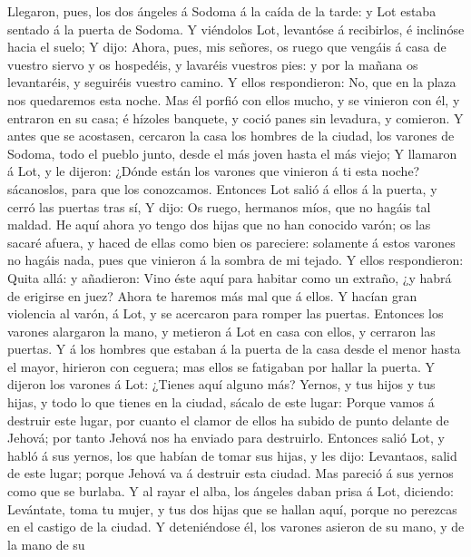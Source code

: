  Llegaron, pues, los dos ángeles á Sodoma á la caída de la
tarde: y Lot estaba sentado á la puerta de Sodoma. Y viéndolos Lot,
levantóse á recibirlos, é inclinóse hacia el suelo;  Y
dijo: Ahora, pues, mis señores, os ruego que vengáis á casa de vuestro
siervo y os hospedéis, y lavaréis vuestros pies: y por la mañana os
levantaréis, y seguiréis vuestro camino. Y ellos respondieron: No, que
en la plaza nos quedaremos esta noche.  Mas él porfió con
ellos mucho, y se vinieron con él, y entraron en su casa; é hízoles
banquete, y coció panes sin levadura, y comieron.  Y antes
que se acostasen, cercaron la casa los hombres de la ciudad, los varones
de Sodoma, todo el pueblo junto, desde el más joven hasta el más viejo;
 Y llamaron á Lot, y le dijeron: ¿Dónde están los varones
que vinieron á ti esta noche? sácanoslos, para que los conozcamos.
 Entonces Lot salió á ellos á la puerta, y cerró las
puertas tras sí,  Y dijo: Os ruego, hermanos míos, que no
hagáis tal maldad.  He aquí ahora yo tengo dos hijas que
no han conocido varón; os las sacaré afuera, y haced de ellas como bien
os pareciere: solamente á estos varones no hagáis nada, pues que
vinieron á la sombra de mi tejado.  Y ellos respondieron:
Quita allá: y añadieron: Vino éste aquí para habitar como un extraño, ¿y
habrá de erigirse en juez? Ahora te haremos más mal que á ellos. Y
hacían gran violencia al varón, á Lot, y se acercaron para romper las
puertas.  Entonces los varones alargaron la mano, y
metieron á Lot en casa con ellos, y cerraron las puertas.
 Y á los hombres que estaban á la puerta de la casa desde
el menor hasta el mayor, hirieron con ceguera; mas ellos se fatigaban
por hallar la puerta.  Y dijeron los varones á Lot:
¿Tienes aquí alguno más? Yernos, y tus hijos y tus hijas, y todo lo que
tienes en la ciudad, sácalo de este lugar:  Porque vamos
á destruir este lugar, por cuanto el clamor de ellos ha subido de punto
delante de Jehová; por tanto Jehová nos ha enviado para destruirlo.
 Entonces salió Lot, y habló á sus yernos, los que habían
de tomar sus hijas, y les dijo: Levantaos, salid de este lugar; porque
Jehová va á destruir esta ciudad. Mas pareció á sus yernos como que se
burlaba.  Y al rayar el alba, los ángeles daban prisa á
Lot, diciendo: Levántate, toma tu mujer, y tus dos hijas que se hallan
aquí, porque no perezcas en el castigo de la ciudad.  Y
deteniéndose él, los varones asieron de su mano, y de la mano de su
